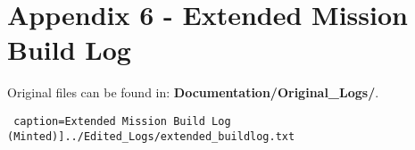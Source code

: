 \documentclass{article}
\begin{document}
\section*{Appendix 6 - Extended Mission Build Log}

Original files can be found in: \textbf{Documentation/Original\_Logs/}.

\texttt{ caption=Extended Mission Build Log (Minted)]{../Edited_Logs/extended_buildlog.txt}}
\end{document}
